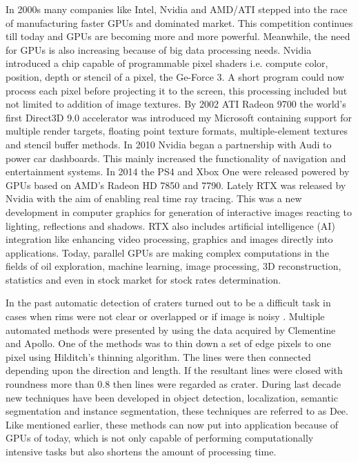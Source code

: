 \documentclass[11pt]{article}
\begin{document}
In 2000s many companies like Intel, Nvidia and AMD/ATI stepped into the race of manufacturing faster GPUs and dominated market. This competition continues till today and GPUs are becoming more and more powerful. Meanwhile, the need for GPUs is also increasing because of big data processing needs. Nvidia introduced a chip capable of programmable pixel shaders i.e. compute color, position, depth or stencil of a pixel, the Ge-Force 3. A short program could now process each pixel before projecting it to the screen, this processing included but not limited to addition of image textures. By 2002 ATI Radeon 9700 the world's first Direct3D 9.0 accelerator was introduced my Microsoft containing support for multiple render targets, floating point texture formats, multiple-element textures and stencil buffer methods. In 2010 Nvidia began a partnership with Audi to power car dashboards. This mainly increased the functionality of navigation and entertainment systems. In 2014 the PS4 and Xbox One were released powered by GPUs based on AMD's Radeon HD 7850 and 7790. Lately RTX was released by Nvidia with the aim of enabling real time ray tracing. This was a new development in computer graphics for generation of interactive images reacting to lighting, reflections and shadows. RTX also includes artificial intelligence (AI) integration like enhancing video processing, graphics and images directly into applications. Today, parallel GPUs are making complex computations in the fields of oil exploration, machine learning, image processing, 3D reconstruction, statistics and even in stock market for stock rates determination. 

In the past automatic detection of craters turned out to be a difficult task in cases when rims were not clear or overlapped or if image is noisy \cite{sawabe_2006}. Multiple automated methods were presented by \cite{sawabe_2006} using the data acquired by Clementine and Apollo. One of the methods was to thin down a set of edge pixels to one pixel using Hilditch's thinning algorithm. The lines were then connected depending upon the direction and length. If the resultant lines were closed with roundness more than 0.8 then lines were regarded as crater. During last decade new techniques have been developed in object detection, localization, semantic segmentation and instance segmentation, these techniques are referred to as Dee. Like mentioned earlier, these methods can now put into application because of GPUs of today, which is not only capable of performing computationally intensive tasks but also shortens the amount of processing time.
\end{document}
